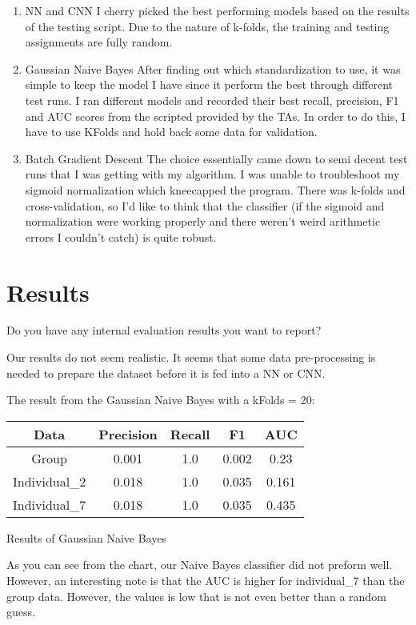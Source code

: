 \documentclass[11pt,a4paper]{article}
\begin{document}
\begin{enumerate}
	\item NN and CNN
		\subitem
		I cherry picked the best performing models based on the results of the testing script.
		Due to the nature of k-folds, the training and testing assignments are fully random.
	\item Gaussian Naive Bayes
	    \subitem
	    After finding out which standardization to use, it was simple to keep the model I have since it perform the best through different test runs.
	    I ran different models and recorded their best recall, precision, F1 and AUC scores from the scripted provided by the TAs.
	    In order to do this, I have to use KFolds and hold back some data for validation.
	 \item Batch Gradient Descent
	    \subitem
	    The choice essentially came down to semi decent test runs that I was getting with my algorithm. I was unable to troubleshoot my sigmoid normalization which kneecapped the program. There was k-folds and cross-validation, so I'd like to think that the classifier (if the sigmoid and normalization were working properly and there weren't weird arithmetic errors I couldn't catch) is quite robust.

\end{enumerate}

\section{Results}
Do you have any internal evaluation results you want to report?


Our results do not seem realistic.
It seems that some data pre-processing is needed to prepare the dataset before it is fed into a NN or CNN.

The result from the Gaussian Naive Bayes with a kFolds = 20:
\begin{center}
    \begin{tabular}{||c || c c c c||}
        \hline
        Data & Precision & Recall & F1 & AUC \\ [0.5ex] 
        \hline\hline
        Group & 0.001 & 1.0 & 0.002 & 0.23 \\ 
        \hline
        Individual\_2 & 0.018 & 1.0 & 0.035 & 0.161 \\
        \hline
        Individual\_7 & 0.018 & 1.0 & 0.035 & 0.435 \\
        \hline
    \end{tabular}\par
    \bigskip
    Results of Gaussian Naive Bayes
\end{center}
As you can see from the chart, our Naive Bayes classifier did not preform well.
However, an interesting note is that the AUC is higher for individual\_7 than the group data.
However, the values is low that is not even better than a random guess.
\end{document}
